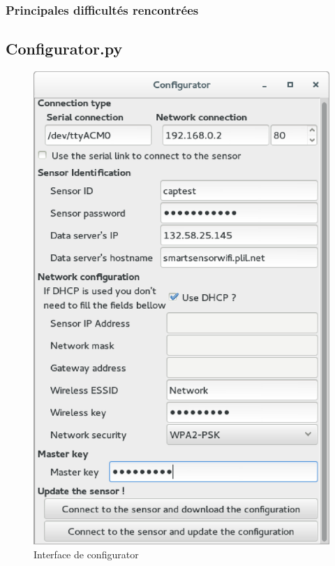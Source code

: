 {		\subsubsection{Principales difficultés rencontrées}
		
	\subsection{Configurator.py}
	\begin{figure}
		  \centering
		  \includegraphics[scale=0.3]{SSWconfigurator.eps}
		  \caption{Interface de configurator}
		  \vspace{-20mm}
	\end{figure}
}
